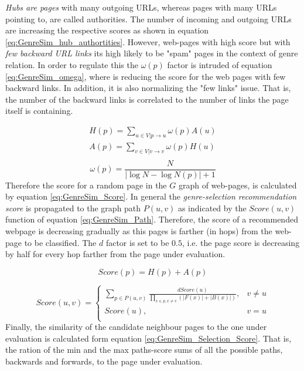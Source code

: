 \textit{Hubs are pages} with many outgoing URLs, whereas pages with many URLs pointing to, are called authorities. The number of incoming and outgoing URLs are increasing the respective scores as shown in equation \ref{eq:GenreSim_hub_authortities}. However, web-pages with high score but with \textit{few backward URL links} its high likely to be "spam" pages in the context of genre relation. In order to regulate this the $\omega(p)$ factor is intruded of equation \ref{eq:GenreSim_omega}, where is reducing the score for the web pages with few backward links. In addition, it is also normalizing the "few links" issue. That is, the number of the backward links is correlated to the number of links the page itself is containing. 

\begin{equation}\label{eq:GenreSim_hub_authortities}
	\begin{array}{l}
		H(p) = \sum_{u \in V|p \to u} \omega(p) A(u) \\  
    	A(p) = \sum_{v \in V|v \to v} \omega(p) H(u) \\
    \end{array}
\end{equation}
\begin{equation}\label{eq:GenreSim_omega}
	\omega(p) = \frac{N}{|\log N - \log N(p) | + 1} 
\end{equation}
Therefore the score for a random page in the $G$ graph of web-pages, is calculated by equation \ref{eq:GenreSim_Score}. In general the \textit{genre-selection recommendation score} is propagated to the graph path $P(u,v)$ as indicated by the $Score(u, v)$ function of equation \ref{eq:GenreSim_Path}. Therefore, the score of a recommended webpage is decreasing gradually as this pages is farther (in hops) from the web-page to be classified. The $d$ factor is set to be $0.5$, i.e. the page score is decreasing by half for every hop farther from the page under evaluation. 

\begin{equation}\label{eq:GenreSim_Score}
	Score(p) = H(p) + A(p)
\end{equation}

\begin{equation}\label{eq:GenreSim_Path}
	Score(u, v) =
      \begin{cases}
      	\sum_{p \in P(u, v)} \frac{d Score(u)}{\prod_{x \in p, x  \neq v} (|F(x)| +|B(x)|)}, & v \neq u \\
        Score(u), & v = u \\ 
       \end{cases}
\end{equation}
Finally, the similarity of the candidate neighbour pages to the one under evaluation is calculated form equation \ref{eq:GenreSim_Selection_Score}. That is, the ration of the min and the max paths-score sums of all the possible paths, backwards and forwards, to the page under evaluation.

